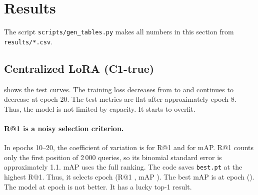 \section{Results}\label{sec:results}

The script \texttt{scripts/gen\_tables.py} makes all numbers in this section from \texttt{results/*.csv}.

\subsection{Centralized LoRA (C1-true)}\label{sec:ceiling}


 shows the test curves. The training loss decreases from \numCFirstLoss{} to \numCFinalLoss{} and continues to decrease at epoch 20. The test metrics are flat after approximately epoch 8. Thus, the model is not limited by capacity. It starts to overfit.

\paragraph{R@1 is a noisy selection criterion.} In epochs 10--20, the coefficient of variation is \numCVR{} for R@1 and \numCVM{} for mAP. R@1 counts only the first position of 2\,000 queries, so its binomial standard error is approximately 1.1\pp. mAP uses the full ranking. The code saves \texttt{best.pt} at the highest R@1. Thus, it selects epoch \numCBestRround{} (R@1 \numCBestR, mAP \numCBestRmAP). The best mAP is at epoch \numCBestMround{} (\numCBestM). The model at epoch \numCBestRround{} is not better. It has a lucky top-1 result.

